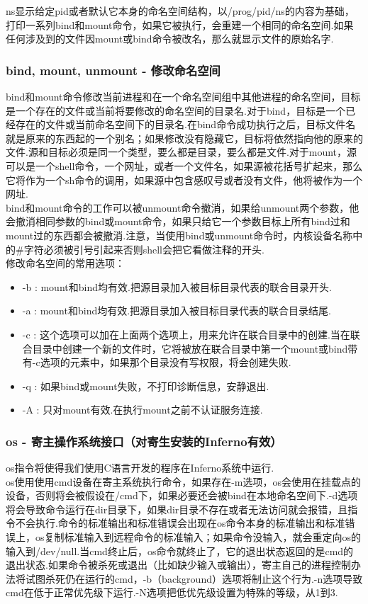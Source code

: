\documentclass[paper=a4]{ctexart} %
\numberwithin{equation}{section} %
\numberwithin{figure}{section} %
\numberwithin{table}{section} %
\newcommand{\n}{\\\indent}
\begin{document}
ns显示给定pid或者默认它本身的命名空间结构，以/prog/pid/ns的内容为基础，打印一系列bind和mount命令，如果它被执行，会重建一个相同的命名空间.如果任何涉及到的文件因mount或bind命令被改名，那么就显示文件的原始名字.

\subsubsection{bind, mount, unmount - 修改命名空间}

  bind和mount命令修改当前进程和在一个命名空间组中其他进程的命名空间，目标是一个存在的文件或当前将要修改的命名空间的目录名.对于bind，目标是一个已经存在的文件或当前命名空间下的目录名.在bind命令成功执行之后，目标文件名就是原来的东西起的一个别名；如果修改没有隐藏它，目标将依然指向他的原来的文件.源和目标必须是同一个类型，要么都是目录，要么都是文件.对于mount，源可以是一个shell命令，一个网址，或者一个文件名，如果源被花括号扩起来，那么它将作为一个sh命令的调用，如果源中包含感叹号或者没有文件，他将被作为一个网址.
\n
 bind和mount命令的工作可以被unmount命令撤消，如果给unmount两个参数，他会撤消相同参数的bind或mount命令，如果只给它一个参数目标上所有bind过和mount过的东西都会被撤消.注意，当使用bind或unmount命令时，内核设备名称中的\#字符必须被引号引起来否则shell会把它看做注释的开头. \n
修改命名空间的常用选项：
\begin{itemize}
\item  -b : mount和bind均有效.把源目录加入被目标目录代表的联合目录开头.
\item  -a : mount和bind均有效.把源目录加入被目标目录代表的联合目录结尾.
\item  -c : 这个选项可以加在上面两个选项上，用来允许在联合目录中的创建.当在联合目录中创建一个新的文件时，它将被放在联合目录中第一个mount或bind带有-c选项的元素中，如果那个目录没有写权限，将会创建失败.
\item  -q : 如果bind或mount失败，不打印诊断信息，安静退出.
\item  -A : 只对mount有效.在执行mount之前不认证服务连接.
\end{itemize}

\subsubsection{os - 寄主操作系统接口（对寄生安装的Inferno有效）}
os指令将使得我们使用C语言开发的程序在Inferno系统中运行.\n
  os使用使用cmd设备在寄主系统执行命令，如果存在-m选项，os会使用在挂载点的设备，否则将会被假设在/cmd下，如果必要还会被bind在本地命名空间下.-d选项将会导致命令运行在dir目录下，如果dir目录不存在或者无法访问就会报错，且指令不会执行.命令的标准输出和标准错误会出现在os命令本身的标准输出和标准错误上，os复制标准输入到远程命令的标准输入；如果命令没输入，就会重定向os的输入到/dev/null.当cmd终止后，os命令就终止了，它的退出状态返回的是cmd的退出状态.如果命令被杀死或退出（比如缺少输入或输出），寄主自己的进程控制办法将试图杀死仍在运行的cmd，-b（background）选项将制止这个行为.-n选项导致cmd在低于正常优先级下运行.-N选项把低优先级设置为特殊的等级，从1到3.
\end{document}
